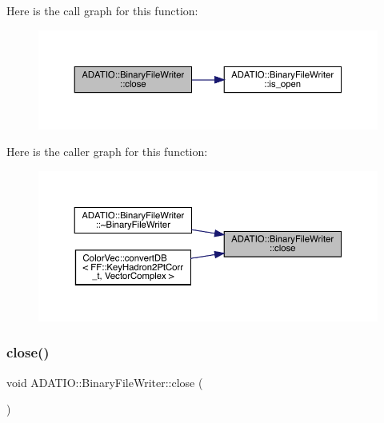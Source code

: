 Here is the call graph for this function\+:
\nopagebreak
\begin{figure}[H]
\begin{center}
\leavevmode
\includegraphics[width=350pt]{dc/d11/classADATIO_1_1BinaryFileWriter_a20a1bdb753aaf28e60de49e80ddf953d_cgraph}
\end{center}
\end{figure}
Here is the caller graph for this function\+:
\nopagebreak
\begin{figure}[H]
\begin{center}
\leavevmode
\includegraphics[width=350pt]{dc/d11/classADATIO_1_1BinaryFileWriter_a20a1bdb753aaf28e60de49e80ddf953d_icgraph}
\end{center}
\end{figure}
\mbox{\label{classADATIO_1_1BinaryFileWriter_a20a1bdb753aaf28e60de49e80ddf953d}} 
\subsubsection{\texorpdfstring{close()}{close()}\hspace{0.1cm}{\footnotesize\ttfamily [2/3]}}
{\footnotesize\ttfamily void A\+D\+A\+T\+I\+O\+::\+Binary\+File\+Writer\+::close (\begin{DoxyParamCaption}{ }\end{DoxyParamCaption})}



